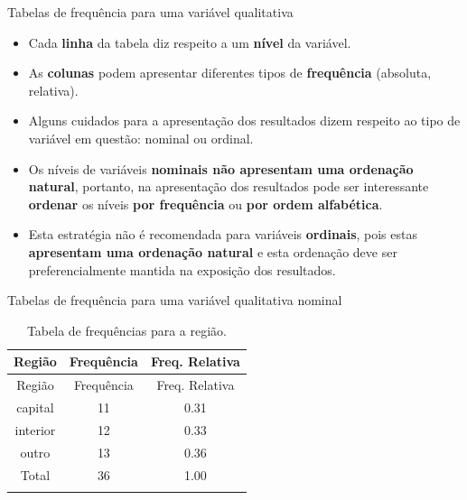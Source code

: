 \documentclass[
  ignorenonframetext,
  serif,
  professionalfont,
  usenames,
  dvipsnames,
  aspectratio = 169]{beamer}
\begin{document}
\begin{frame}{Tabelas de frequência para uma variável qualitativa}
\label{tabelas-de-frequuxeancia-para-uma-variuxe1vel-qualitativa-1}
\begin{itemize}
\item
  Cada \textbf{linha} da tabela diz respeito a um \textbf{nível} da
  variável.
\item
  As \textbf{colunas} podem apresentar diferentes tipos de
  \textbf{frequência} (absoluta, relativa).
\item
  Alguns cuidados para a apresentação dos resultados dizem respeito ao
  tipo de variável em questão: nominal ou ordinal.
\item
  Os níveis de variáveis
  \textbf{nominais não apresentam uma ordenação natural}, portanto, na
  apresentação dos resultados pode ser interessante \textbf{ordenar} os
  níveis \textbf{por frequência} ou \textbf{por ordem alfabética}.
\item
  Esta estratégia não é recomendada para variáveis \textbf{ordinais},
  pois estas \textbf{apresentam uma ordenação natural} e esta ordenação
  deve ser preferencialmente mantida na exposição dos resultados.
\end{itemize}
\end{frame}

\begin{frame}{Tabelas de frequência para uma variável qualitativa
nominal}
\label{tabelas-de-frequuxeancia-para-uma-variuxe1vel-qualitativa-nominal}
\begin{longtable}[]{@{}ccc@{}}
\caption{Tabela de frequências para a região.}\tabularnewline
\toprule\noalign{}
Região & Frequência & Freq. Relativa \\
\midrule\noalign{}
\endfirsthead
\toprule\noalign{}
Região & Frequência & Freq. Relativa \\
\midrule\noalign{}
\endhead
capital & 11 & 0.31 \\
interior & 12 & 0.33 \\
outro & 13 & 0.36 \\
Total & 36 & 1.00 \\
\bottomrule\noalign{}
\end{longtable}
\end{frame}
\end{document}
